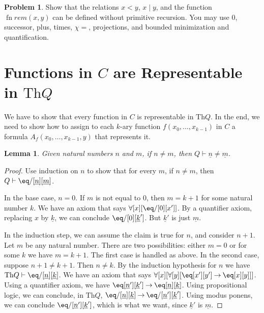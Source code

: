 \documentclass[10pt,a4paper]{article}
\theoremstyle{plain}
\newtheorem{lem}[thm]{Lemma}
\theoremstyle{definition}
\newtheorem{prob}{Problem}[section]
\theoremstyle{remark}
\newcommand*{\olfileid}[3]{}
\newcommand*{\olsection}[1]{\section*{#1}}
\providecommand{\lif}{\mathbin{\rightarrow}}
\providecommand{\lforall}{\mathord{\forall}}
\providecommand{\Proves}{\mathrel{\vdash}}
\providecommand{\Th}{\ensuremath{\mathrm{Th}}}
\providecommand{\num}[1]{\underline{#1}}
\providecommand{\Char}{\chi}
\providecommand{\fn}{\operatorname{fn}}
\begin{document}
\begin{prob}
  Show that the relations $x < y$, $x \mid y$, and the
  function~$\fn{rem}(x,y)$ can be defined without primitive recursion.
  You may use $0$, successor, plus, times, $\Char{=}$, projections,
  and bounded minimization and quantification.
\end{prob}





\olfileid{inc}{req}{cre}
\olsection{Functions in $C$ are Representable in $\Th{Q}$}

We have to show that every function in $C$ is representable in
$\Th{Q}$. In the end, we need to show how to assign to each $k$-ary
function $f(x_0,\dots,x_{k-1})$ in $C$ a formula
$A_f(x_0,\dots,x_{k-1},y)$ that represents it.

\begin{lem}
Given natural numbers $n$ and $m$, if $n \neq m$, then $Q \Proves \num
n \neq \num m$.
\end{lem}

\begin{proof}
Use induction on $n$ to show that for every $m$, if $n \neq m$, then
$Q \Proves \eq/[\num n][\num m]$.

In the base case, $n = 0$. If $m$ is not equal to $0$, then $m = k +
1$ for some natural number $k$. We have an axiom that says
$\lforall[x][\eq/[0][x']]$. By a quantifier axiom, replacing $x$ by
  $\num k$, we can conclude $\eq/[0][\num k']$. But $\num k'$ is just
  $\num m$.

In the induction step, we can assume the claim is true for $n$, and
consider $n+1$. Let $m$ be any natural number. There are two
possibilities: either $m = 0$ or for some $k$ we have $m = k+1$. The
first case is handled as above. In the second case, suppose $n+1 \neq
k+1$. Then $n \neq k$. By the induction hypothesis for $n$ we have
$\Th{Q} \Proves \eq/[\num n][\num k]$. We have an axiom that says
$\lforall[x][\lforall[y][\eq[x'][y'] \lif \eq[x][y]]]$. Using a
quantifier axiom, we have $\eq[\num n'][\num k'] \lif \eq[\num n][\num
  k]$. Using propositional logic, we can conclude, in $\Th{Q}$,
$\eq/[\num n][\num k] \lif \eq/[\num n'][\num k']$. Using modus
ponens, we can conclude $\eq/[\num n'][\num k']$, which is what we want,
since $\num k'$ is $\num m$.
\end{proof}
\end{document}
